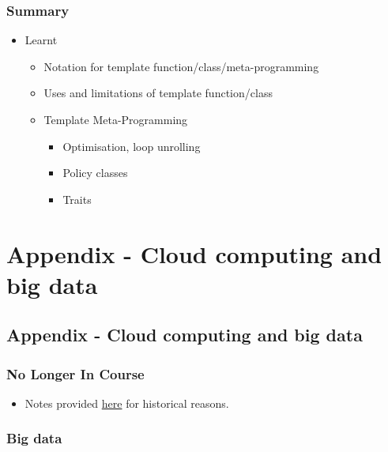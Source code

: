\subsubsection{Summary}\label{summary-4}

\begin{itemize}
\itemsep1pt\parskip0pt
\item
  Learnt

  \begin{itemize}
  \itemsep1pt\parskip0pt
  \item
    Notation for template function/class/meta-programming
  \item
    Uses and limitations of template function/class
  \item
    Template Meta-Programming

    \begin{itemize}
    \itemsep1pt\parskip0pt
    \item
      Optimisation, loop unrolling
    \item
      Policy classes
    \item
      Traits
    \end{itemize}
  \end{itemize}
\end{itemize}

\section{Appendix - Cloud computing and big
data}\label{appendix---cloud-computing-and-big-data}

\subsection{Appendix - Cloud computing and big
data}\label{appendix---cloud-computing-and-big-data-1}

\subsubsection{No Longer In Course}\label{no-longer-in-course-1}

\begin{itemize}
\itemsep1pt\parskip0pt
\item
  Notes provided \href{sec01cloud}{here} for historical reasons.
\end{itemize}

\subsubsection{Big data}\label{big-data}

